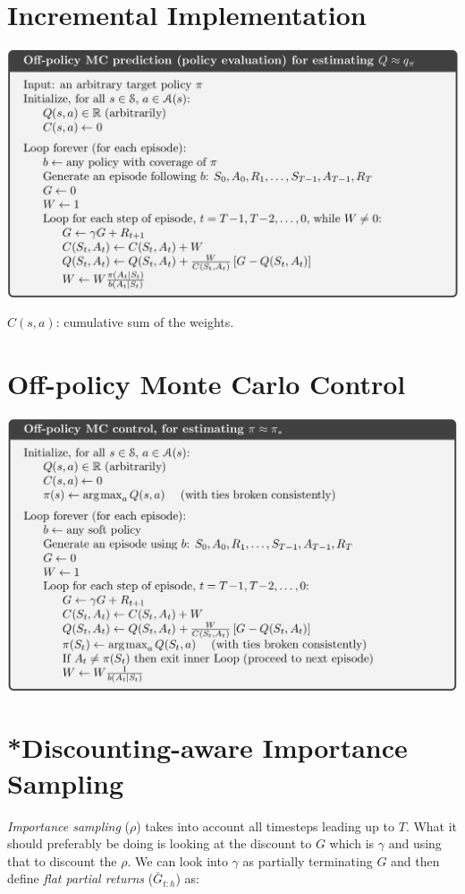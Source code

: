 \section{Incremental Implementation}
\begin{center}
    \includegraphics[width=\textwidth]{img/alg_off_policy_mc_prediction.png}
    \begin{itemize*}
        \item $C(s,a)$: cumulative sum of the weights.
    \end{itemize*}
\end{center}

\section{Off-policy Monte Carlo Control}
\begin{center}
    \includegraphics[width=\textwidth]{img/alg_off_policy_mc_control.png}
\end{center}

\section{*Discounting-aware Importance Sampling}
\emph{Importance sampling} ($\rho$) takes into account all timesteps leading up to $T$.
What it should preferably be doing is looking at the discount to $G$ which is $\gamma$ and
using that to discount the $\rho$.
We can look into $\gamma$ as partially terminating $G$ and then define
\emph{flat partial returns} ($\bar{G}_{t:h}$) as:

